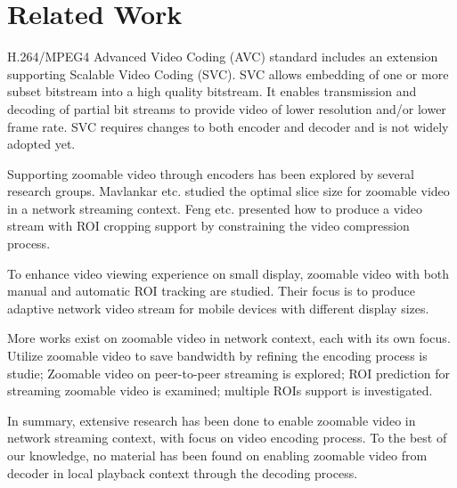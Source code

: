 \section{Related Work}
H.264/MPEG4 Advanced Video Coding (AVC) standard includes an extension supporting Scalable Video Coding (SVC)\cite{Schwarz07overviewof}. SVC allows embedding of one or more subset bitstream into a high quality bitstream. It enables transmission and decoding of partial bit streams to provide video of lower resolution and/or lower frame rate. SVC requires changes to both encoder and decoder and is not widely adopted yet. 

Supporting zoomable video through encoders has been explored by several research groups. Mavlankar etc. studied the optimal slice size for zoomable video in a network streaming context\cite{Mavlankar07optimalslice}. Feng etc. presented how to produce a video stream  with ROI cropping support by constraining the video compression process\cite{Feng:2011:SRC:2000486.2000491}. 

To enhance video viewing experience on small display, zoomable video with both manual \cite{roi02} and automatic ROI tracking \cite{Fan03lookinginto} are studied. Their focus is to produce adaptive network video stream for mobile devices with different display sizes. 

More works exist on zoomable video in network context, each with its own focus. Utilize zoomable video to save bandwidth by refining the encoding process is studie\cite{Ngo:2011:AEZ:1943552.1943581}; Zoomable video on peer-to-peer streaming is explored\cite{Mavlankar_peer-to-peermulticast}; ROI prediction for streaming zoomable video is examined\cite{roi_pred}; multiple ROIs support is investigated\cite{multiroi}. 

In summary, extensive research has been done to enable zoomable video in network streaming context, with focus on video encoding process. To the best of our knowledge, no material has been found on enabling zoomable video from decoder in local playback context through the decoding process.  

